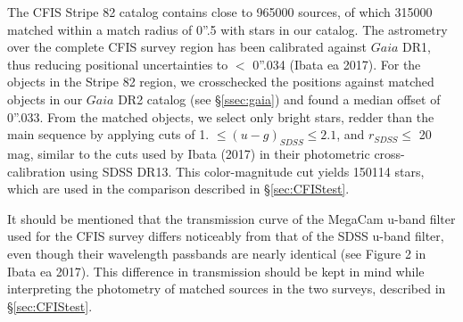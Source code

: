 \documentclass{aastex63}
\begin{document}
The CFIS Stripe 82 catalog contains close to 965000 sources, of which 315000 matched within a match radius of 0''.5 with stars in our catalog. The astrometry over the complete CFIS survey region has been calibrated against $Gaia$ DR1, thus reducing positional uncertainties to $<$ 0''.034 (Ibata ea 2017). For the objects in the Stripe 82 region, we crosschecked the positions against matched objects in our $Gaia$ DR2 catalog (see \S \ref{ssec:gaia}) and found a median offset of 0''.033. From the matched objects, we select only bright stars, redder than the main sequence by applying cuts of 1. $\leq (u-g)_{SDSS} \leq 2.1$, and $r_{SDSS} \leq $ 20 mag, similar to the cuts used by Ibata (2017) in their photometric cross-calibration using SDSS DR13. This color-magnitude cut yields 150114 stars, which are used in the comparison described in \S \ref{sec:CFIStest}.   

It should be mentioned that the transmission curve of the MegaCam u-band filter used for the CFIS survey differs noticeably from that of the SDSS u-band filter, even though their wavelength passbands are nearly identical (see Figure 2 in Ibata ea 2017). This difference in transmission should be kept in mind while interpreting the photometry of matched sources in the two surveys, described in \S \ref{sec:CFIStest}.
   




\end{document}
